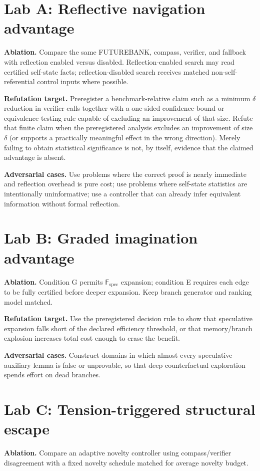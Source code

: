 \documentclass[11pt,openany]{book}
\theoremstyle{definition}
\theoremstyle{remark}
\newcommand{\Future}{\mathsf{F}}
\newcommand{\Spec}{\Future_{\mathrm{spec}}}
\begin{document}
\section{Lab A: Reflective navigation advantage}
\textbf{Ablation.} Compare the same FUTUREBANK, compass, verifier, and fallback with reflection enabled versus disabled. Reflection-enabled search may read certified self-state facts; reflection-disabled search receives matched non-self-referential control inputs where possible.

\textbf{Refutation target.} Preregister a benchmark-relative claim such as a minimum $\delta$ reduction in verifier calls together with a one-sided confidence-bound or equivalence-testing rule capable of excluding an improvement of that size. Refute that finite claim when the preregistered analysis excludes an improvement of size $\delta$ (or supports a practically meaningful effect in the wrong direction). Merely failing to obtain statistical significance is not, by itself, evidence that the claimed advantage is absent.

\textbf{Adversarial cases.} Use problems where the correct proof is nearly immediate and reflection overhead is pure cost; use problems where self-state statistics are intentionally uninformative; use a controller that can already infer equivalent information without formal reflection.

\section{Lab B: Graded imagination advantage}
\textbf{Ablation.} Condition G permits $\Spec$ expansion; condition E requires each edge to be fully certified before deeper expansion. Keep branch generator and ranking model matched.

\textbf{Refutation target.} Use the preregistered decision rule to show that speculative expansion falls short of the declared efficiency threshold, or that memory/branch explosion increases total cost enough to erase the benefit.

\textbf{Adversarial cases.} Construct domains in which almost every speculative auxiliary lemma is false or unprovable, so that deep counterfactual exploration spends effort on dead branches.

\section{Lab C: Tension-triggered structural escape}
\textbf{Ablation.} Compare an adaptive novelty controller using compass/verifier disagreement with a fixed novelty schedule matched for average novelty budget.
\end{document}
